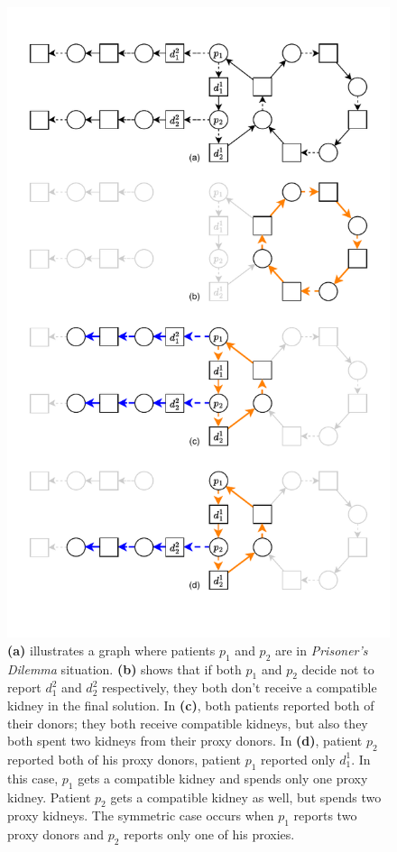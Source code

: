 \begin{figure}
    \centering
    \includegraphics{data/prisoners_dilemma.pdf}
    \caption[Prisoner's dilemma in multiple-donors model]{\textbf{(a)} illustrates a graph where patients $p_1$ and $p_2$ are in \textit{Prisoner's Dilemma} situation. \textbf{(b)} shows that if both $p_1$ and $p_2$ decide not to report $d_1^2$ and $d_2^2$ respectively, they both don't receive a compatible kidney in the final solution. In \textbf{(c)}, both patients reported both of their donors; they both receive compatible kidneys, but also they both spent two kidneys from their proxy donors. In \textbf{(d)}, patient $p_2$ reported both of his proxy donors, patient $p_1$ reported only $d_1^1$. In this case, $p_1$ gets a compatible kidney and spends only one proxy kidney. Patient $p_2$ gets a compatible kidney as well, but spends two proxy kidneys. The symmetric case occurs when $p_1$ reports two proxy donors and $p_2$ reports only one of his proxies.}
    \label{fig:prisoners_dilemma}
\end{figure}

